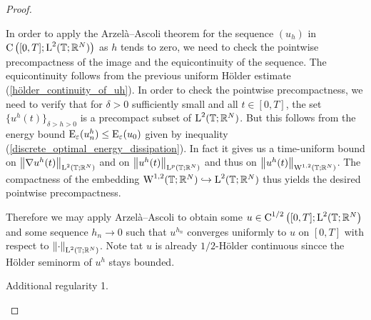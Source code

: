 \begin{proof}
\begin{description}[wide=0pt]
		In order to apply the Arzelà--Ascoli theorem for the sequence $ (u_{ h 
		} ) $ in $ \operatorname{C} \left( [ 0 , T ] ; \operatorname{L}^{ 2 } ( \operatorname{\mathbb{T}} ; \mathbb{ R 
		}^{ N } ) \right) $ as $ h $ tends to zero, we need to check the 
		pointwise 
		precompactness 
		of the image and the equicontinuity of the sequence. 
		The equicontinuity follows from the previous uniform Hölder estimate 
		(\ref{hölder_continuity_of_uh}).
		In order to check the pointwise precompactness, we need to verify that 
		for $ \delta > 0 $ sufficiently small and all $ t \in [ 0 , T ] $, the 
		set
		$ \{ u^{ h } ( t ) \}_{ \delta > h > 0 } $ is a precompact subset of $ 
		\operatorname{L}^{ 2 } ( \operatorname{\mathbb{T}} ; \mathbb{ R }^{ N } ) $. 
		But this follows from the energy bound $ \operatorname{E}_{ \varepsilon } ( u_{ 
		n }^{ h } ) \leq \operatorname{E}_{ \varepsilon } ( u_{ 0 } ) $ given by 
		inequality (\ref{discrete_optimal_energy_dissipation}). In fact it 
		gives us a time-uniform bound on $ \norm{ \nabla u^{ h }( t ) }_{\operatorname{L}^{ 
		2 }( \operatorname{\mathbb{T}}; \mathbb{ R }^{ N } ) } $ and on $ \norm{ u^{ h } ( t 
		)}_{ \operatorname{L}^{ p } ( \operatorname{\mathbb{T}}; \mathbb{ R }^{ N } ) } $ and thus on $ 
		\norm{ u^{ h } ( t )}_{ \operatorname{W}^{ 1 , 2 } ( \operatorname{\mathbb{T}}; \mathbb{ R }^{ N } 
		) } $. 
		The compactness of the embedding
		$ \operatorname{W}^{ 1 , 2 } ( \operatorname{\mathbb{T}} ; \mathbb{ R }^{ N } ) \hookrightarrow \operatorname{L}^{ 2 } ( \operatorname{\mathbb{T}}; \mathbb{ R }^{ N } ) $ thus yields the desired pointwise precompactness.
		
		Therefore we may apply Arzelà--Ascoli to obtain some $ u \in \operatorname{C}^{ 1 
		/ 2 } \left( [ 0, T ] ; \operatorname{L}^{ 2 } ( \operatorname{\mathbb{T}} ; \mathbb{ R }^{ N } 
		\right) $ and some  sequence $ h_{ n } \to 0 $ such that
		$ u^{ h_{ n } } $ converges uniformly to $ u $ on $ [ 0 , T ] $ with 
		respect to $ \norm{ \cdot }_{ \operatorname{L}^{ 2 } ( \operatorname{\mathbb{T}} ; \mathbb{ R }^{ N 
		} ) } $.
		Note tat $ u $ is already $ 1/2 $-Hölder continuous sincce the Hölder 
		seminorm of $ u^{ h } $ stays bounded.
		
		\item[Step 6:] Additional regularity 1.
		

\end{description}
\end{proof}
